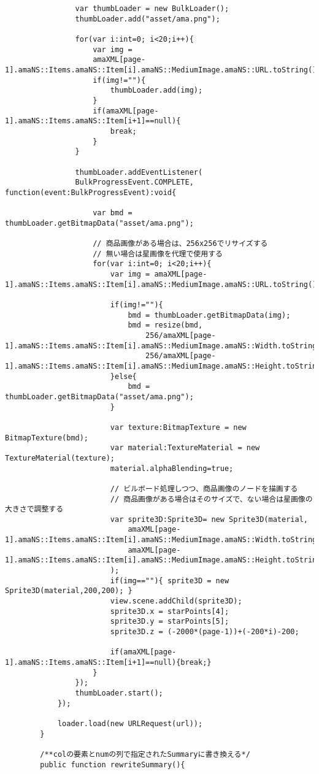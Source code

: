 {\begin{verbatim}
				var thumbLoader = new BulkLoader();
				thumbLoader.add("asset/ama.png");
				
				for(var i:int=0; i<20;i++){
					var img = 
					amaXML[page-1].amaNS::Items.amaNS::Item[i].amaNS::MediumImage.amaNS::URL.toString();
					if(img!=""){
						thumbLoader.add(img);
					}
					if(amaXML[page-1].amaNS::Items.amaNS::Item[i+1]==null){
						break;
					}
				}
				
				thumbLoader.addEventListener(
				BulkProgressEvent.COMPLETE, function(event:BulkProgressEvent):void{
											 
					var bmd = thumbLoader.getBitmapData("asset/ama.png");
					
					// 商品画像がある場合は、256x256でリサイズする
					// 無い場合は星画像を代理で使用する
					for(var i:int=0; i<20;i++){
						var img = amaXML[page-1].amaNS::Items.amaNS::Item[i].amaNS::MediumImage.amaNS::URL.toString();
						
						if(img!=""){
							bmd = thumbLoader.getBitmapData(img);
							bmd = resize(bmd,
								256/amaXML[page-1].amaNS::Items.amaNS::Item[i].amaNS::MediumImage.amaNS::Width.toString(),
								256/amaXML[page-1].amaNS::Items.amaNS::Item[i].amaNS::MediumImage.amaNS::Height.toString());
						}else{
							bmd = thumbLoader.getBitmapData("asset/ama.png");
						}
						
						var texture:BitmapTexture = new BitmapTexture(bmd);
						var material:TextureMaterial = new TextureMaterial(texture);
						material.alphaBlending=true;
						
						// ビルボード処理しつつ、商品画像のノードを描画する
						// 商品画像がある場合はそのサイズで、ない場合は星画像の大きさで調整する
						var sprite3D:Sprite3D= new Sprite3D(material,
							amaXML[page-1].amaNS::Items.amaNS::Item[i].amaNS::MediumImage.amaNS::Width.toString(),
							amaXML[page-1].amaNS::Items.amaNS::Item[i].amaNS::MediumImage.amaNS::Height.toString()
						);
						if(img==""){ sprite3D = new Sprite3D(material,200,200); }
						view.scene.addChild(sprite3D);
						sprite3D.x = starPoints[4];
						sprite3D.y = starPoints[5];
						sprite3D.z = (-2000*(page-1))+(-200*i)-200;
						
						if(amaXML[page-1].amaNS::Items.amaNS::Item[i+1]==null){break;}
					}
				});
				thumbLoader.start();
			});
			
			loader.load(new URLRequest(url));
		}
		
		/**colの要素とnumの列で指定されたSummaryに書き換える*/
		public function rewriteSummary(){
			

\end{verbatim}}
